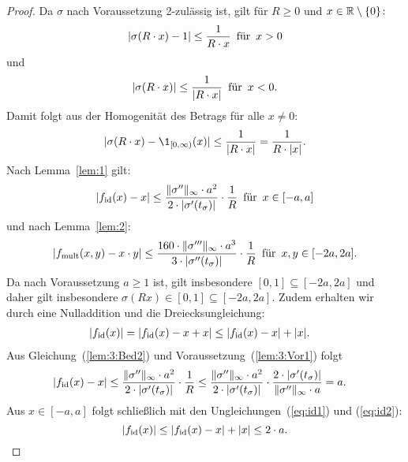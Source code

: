  \begin{proof}
  Da $\sigma$ nach Voraussetzung 2-zulässig ist, gilt für $R \geq 0$ und $x \in \mathbb{R}\setminus\{0\}\colon$ $$|\sigma(R \cdot x) - 1| \leq \frac{1}{R\cdot x} \text{\, für \,} x > 0$$ und $$|\sigma(R \cdot x)| \leq \frac{1}{|R \cdot x|} \text{\, für \,} x < 0.$$
Damit folgt aus der Homogenität des Betrags für alle $x \neq 0$: 
\begin{equation}
\label{lem:3:Bed1} 
|\sigma(R \cdot x) - \1_{[0, \infty)}(x)| \leq \frac{1}{|R \cdot x|} = \frac{1}{R \cdot |x|}.
\end{equation} 
Nach Lemma~\ref{lem:1} gilt:
\begin{equation}
\label{lem:3:Bed2} 
|f_{\mathrm{id}}(x) - x| \leq \frac{\|\sigma''\|_{\infty} \cdot a^2}{2 \cdot |\sigma'(t_{\sigma})|} \cdot \frac{1}{R} \text{\, für \,} x \in [-a, a]
\end{equation}
 und nach Lemma~\ref{lem:2}:
\begin{equation}
\label{lem:3:Bed3}
 |f_{\mathrm{mult}}(x, y) - x \cdot y| \leq \frac{160 \cdot \|\sigma'''\|_{\infty} \cdot a ^3}{3 \cdot |\sigma''(t_{\sigma})|} \cdot \frac{1}{R} \text{\, für \,} x, y \in [-2a, 2a].
 \end{equation} 
Da nach Voraussetzung $a \geq 1$ ist, gilt insbesondere $[0, 1] \subseteq [-2a, 2a]$ und daher gilt insbesondere $\sigma(Rx) \in [0, 1]\subseteq [-2a, 2a].$ 
Zudem erhalten wir durch eine Nulladdition und die Dreiecksungleichung:
\begin{equation}
\label{eq:id1}
\begin{split}
|f_{\mathrm{id}}(x)| & = |f_{\mathrm{id}}(x) - x + x| \leq |f_{\mathrm{id}}(x) -x| + |x|.
\end{split}
\end{equation}
Aus Gleichung~(\ref{lem:3:Bed2}) und Voraussetzung~(\ref{lem:3:Vor1}) folgt
\begin{equation}
\label{eq:id2}
\begin{split}
|f_{\mathrm{id}}(x) -x| & \leq \frac{\|\sigma''\|_{\infty} \cdot a^2}{2 \cdot |\sigma'(t_{\sigma})|} \cdot \frac{1}{R}
\leq \frac{\|\sigma''\|_{\infty} \cdot a^2}{2 \cdot |\sigma'(t_{\sigma})|} \cdot \frac{2 \cdot |\sigma'(t_{\sigma})|}{\|\sigma''\|_{\infty} \cdot a}
= a.
\end{split}
\end{equation}
Aus $x \in [-a, a]$ folgt schließlich mit den Ungleichungen~(\ref{eq:id1}) und (\ref{eq:id2}):
\begin{equation*}
|f_{\mathrm{id}}(x)| \leq |f_{\mathrm{id}}(x) -x| + |x| \leq 2 \cdot a.
\end{equation*}

\end{proof}
